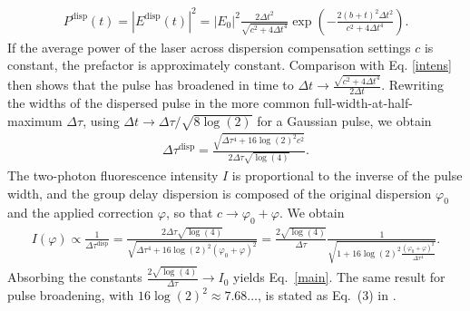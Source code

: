 \documentclass[10pt,letterpaper]{article}
\begin{document}
{\begin{eqnarray}
P^\text{disp}(t) = |E^\text{disp}(t)|^2 = |E_0|^2\frac{2\Delta t^2}{\sqrt{c^2 + 4\Delta t^4}}\exp\left(-\frac{2(b+t)^2\Delta t^2}{c^2+4\Delta t^4}\right)\label{intens_disp}.
\end{eqnarray}
If the average power of the laser across dispersion compensation settings $c$ is constant, the prefactor is approximately constant. Comparison with Eq. \eqref{intens} then shows that the pulse has broadened in time to $\Delta t\to \frac{\sqrt{c^2+4\Delta t^4}}{2\Delta t}$. Rewriting the widths of the dispersed pulse in the more common full-width-at-half-maximum $\Delta\tau$, using $\Delta t \to \Delta\tau/\sqrt{8\log(2)}$ for a Gaussian pulse, we obtain
\begin{eqnarray}
\Delta\tau^\text{disp} = \frac{\sqrt{\Delta\tau^4 + 16\log(2)^2c^2}}{2 \Delta\tau\sqrt{\log(4)}}.
\end{eqnarray}
The two-photon fluorescence intensity $I$ is proportional to the inverse of the pulse width, and the group delay dispersion is composed of the original dispersion $\varphi_0$ and the applied correction $\varphi$, so that $c \to \varphi_0 + \varphi$. We obtain
\begin{eqnarray}
I(\varphi) \propto \frac{1}{\Delta\tau^\text{disp}} = \frac{2 \Delta\tau\sqrt{\log(4)}}{\sqrt{\Delta\tau^4 + 16\log(2)^2(\varphi_0 + \varphi)^2}} = \frac{2\sqrt{\log(4)}}{\Delta\tau}\frac{1}{\sqrt{1 + 16\log(2)^2\frac{(\varphi_0 + \varphi)^2}{\Delta\tau^4}}}.
\end{eqnarray}
Absorbing the constants $\frac{2\sqrt{\log(4)}}{\Delta\tau}\to I_0$ yields Eq.~\eqref{main}. The same result for pulse broadening, with $16\log(2)^2\approx 7.68\dots$, is stated as Eq.~(3) in \cite{Zipfel2003}.
}
\nolinenumbers
\end{document}
